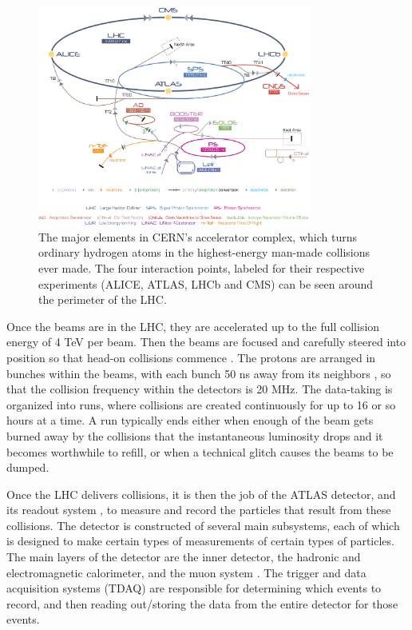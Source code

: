 \begin{figure}
	\centering
	\includegraphics[width=0.8\textwidth]{ATLASDetector/images/Cern-Accelerator-Complex.pdf}
	\caption{ The major elements in CERN's accelerator complex, which turns ordinary hydrogen atoms in the highest-energy man-made collisions ever made. The four interaction points, labeled for their respective experiments (ALICE, ATLAS, LHCb and CMS) can be seen around the perimeter of the LHC. \label{fig:accelerator_complex}}
\end{figure}



Once the beams are in the LHC, they are accelerated up to the full collision energy of 4 TeV 
per beam.  Then the beams are focused  and carefully steered into position so that head-on collisions commence
.  The protons are arranged in bunches within the beams, with each bunch 50 ns away from its neighbors
, so that the collision frequency within the detectors is 20 MHz.  The data-taking is organized into 
runs, where collisions are created continuously for up to 16 or so hours at a time.  A run 
typically ends either when enough of the beam gets burned away by the collisions that the instantaneous luminosity drops and 
it becomes worthwhile to refill, or when a technical glitch causes the beams to be dumped.



Once the LHC delivers collisions, it is then the job of the ATLAS detector, and its readout system
, to measure and record the particles that result from these collisions.  The detector is constructed of several main 
subsystems, each of which is designed to make certain types of measurements of certain types of particles.  The 
main layers of the detector are the inner detector, the hadronic and electromagnetic calorimeter, and the muon system
.  The trigger and data acquisition systems (TDAQ) are responsible for determining which events to record, and 
then reading out/storing the data from the entire detector for those events.


